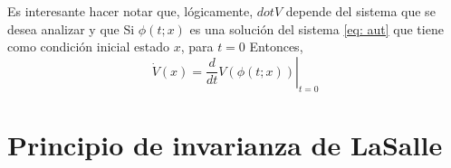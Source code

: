 Es interesante hacer notar que, lógicamente, $dot V$ depende del sistema que se desea analizar y que Si $\phi(t;x)$ es una solución del sistema \ref{eq: aut} que tiene como condición inicial estado $x$, para $t=0$ Entonces,
\begin{equation}
\dot V(x) =\left. \frac{d}{dt}V(\phi (t;x))\right|_{t=0}
\end{equation}
\section{Principio de invarianza de LaSalle}

